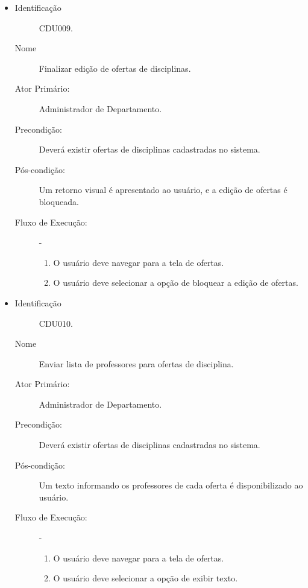 \begin{itemize}
     \item 
        \begin{description}
           \item[Identificação] CDU009.
           \item[Nome] Finalizar edição de ofertas de disciplinas.
           \item[Ator Primário:] Administrador de Departamento.
           \item[Precondição:] Deverá existir ofertas de disciplinas cadastradas no sistema. 
           \item[Pós-condição:] Um retorno visual é apresentado ao usuário, e a edição de ofertas é bloqueada.
           \item[Fluxo de Execução:] -
                \begin{enumerate}
                    \item O usuário deve navegar para a tela de ofertas.
                    \item O usuário deve selecionar a opção de bloquear a edição de ofertas.
                \end{enumerate}
        \end{description} 
    \vspace{10pt}

    \item 
        \begin{description}
           \item[Identificação] CDU010.
           \item[Nome] Enviar lista de professores para ofertas de disciplina.
           \item[Ator Primário:] Administrador de Departamento.
           \item[Precondição:] Deverá existir ofertas de disciplinas cadastradas no sistema. 
           \item[Pós-condição:] Um texto informando os professores de cada oferta é disponibilizado ao usuário.
           \item[Fluxo de Execução:] -
                \begin{enumerate}
                    \item O usuário deve navegar para a tela de ofertas.
                    \item O usuário deve selecionar a opção de exibir texto.
                \end{enumerate}
        \end{description} 
    \vspace{10pt}


\end{itemize}
